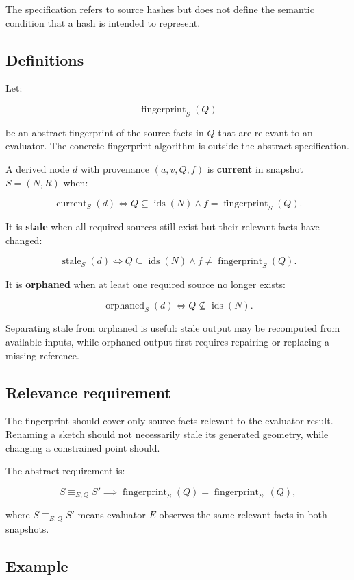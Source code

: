 \documentclass[11pt]{article}
\begin{document}
The specification refers to source hashes but does not define the semantic
condition that a hash is intended to represent.

\subsection{Definitions}

Let:

\[
\operatorname{fingerprint}_S(Q)
\]

be an abstract fingerprint of the source facts in $Q$ that are relevant to an
evaluator. The concrete fingerprint algorithm is outside the abstract
specification.

A derived node $d$ with provenance $(a,v,Q,f)$ is \textbf{current} in snapshot
$S=(N,R)$ when:

\[
\operatorname{current}_S(d)
\iff
Q\subseteq\operatorname{ids}(N)
\land
f=\operatorname{fingerprint}_S(Q).
\]

It is \textbf{stale} when all required sources still exist but their relevant
facts have changed:

\[
\operatorname{stale}_S(d)
\iff
Q\subseteq\operatorname{ids}(N)
\land
f\neq\operatorname{fingerprint}_S(Q).
\]

It is \textbf{orphaned} when at least one required source no longer exists:

\[
\operatorname{orphaned}_S(d)
\iff
Q\nsubseteq\operatorname{ids}(N).
\]

Separating stale from orphaned is useful: stale output may be recomputed from
available inputs, while orphaned output first requires repairing or replacing a
missing reference.

\subsection{Relevance requirement}

The fingerprint should cover only source facts relevant to the evaluator
result. Renaming a sketch should not necessarily stale its generated geometry,
while changing a constrained point should.

The abstract requirement is:

\[
S\equiv_{E,Q}S'
\implies
\operatorname{fingerprint}_S(Q)
=
\operatorname{fingerprint}_{S'}(Q),
\]

where $S\equiv_{E,Q}S'$ means evaluator $E$ observes the same relevant facts
in both snapshots.

\subsection{Example}
\end{document}
